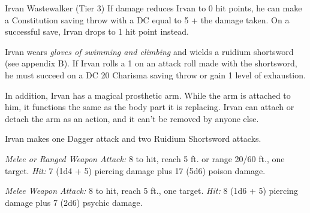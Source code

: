 \documentclass[10pt,a4paper,twoside,bg=print,twocolumn,openany,nodeprecatedcode]{dndbook}
\begin{document}
\begin{DndMonster}[float=t]{Irvan Wastewalker (Tier 3)}
\DndMonsterBasics[
armor-class = {17 (studded leather armor)},
hit-points = {\DndDice{19d8 + 38}},
speed = {40 ft., swim 40 ft. \textit{(see special equipment)}}
]
\DndMonsterAbilityScores[
 str = 10,
 dex = 20,
 con = 14,
 int = 16,
 wis = 16,
 cha = 16
]
\DndMonsterDetails[
saving-throws = {Dex +8, Con +5},
skills = {Acrobatics +8, Deception +9, Stealth +11, Survival +6},
languages = {Common, Goblin, Orc},
challenge = 8,
]
If damage reduces Irvan to 0 hit points, he can make a Constitution saving throw with a DC equal to 5 + the damage taken. On a successful save, Irvan drops to 1 hit point instead.

Irvan wears \textit{gloves of swimming and climbing} and wields a ruidium shortsword (see appendix B). If Irvan rolls a 1 on an attack roll made with the shortsword, he must succeed on a DC 20 Charisma saving throw or gain 1 level of exhaustion.

In addition, Irvan has a magical prosthetic arm. While the arm is attached to him, it functions the same as the body part it is replacing. Irvan can attach or detach the arm as an action, and it can't be removed by anyone else.

Irvan makes one Dagger attack and two Ruidium Shortsword attacks.

\textsl{Melee or Ranged Weapon Attack:} 8 to hit, reach 5 ft. or range 20/60 ft., one target. \textsl{Hit:} 7 (1d4 + 5) piercing damage plus 17 (5d6) poison damage.

\textsl{Melee Weapon Attack:} 8 to hit, reach 5 ft., one target. \textsl{Hit:} 8 (1d6 + 5) piercing damage plus 7 (2d6) psychic damage.

\end{DndMonster}
\end{document}
